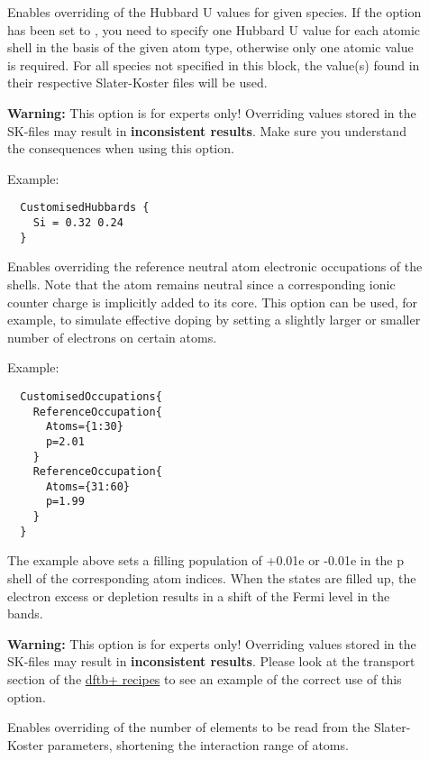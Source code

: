 \begin{description}
\item[] Enables overriding of the Hubbard U values for given species. If the
  option  has been set to , you need to specify one Hubbard U value
  for each atomic shell in the basis of the given atom type, otherwise only one atomic value is
  required. For all species not specified in this block, the value(s) found in their respective
  Slater-Koster files will be used.

  \textbf{Warning:} This option is for experts only! Overriding values stored in the SK-files may
  result in \textbf{inconsistent results}. Make sure you understand the consequences when using this
  option.

  Example:
  \begin{verbatim}
  CustomisedHubbards {
    Si = 0.32 0.24
  }
  \end{verbatim}

\item[] Enables overriding the reference neutral atom
  electronic occupations of the shells. Note that the atom remains neutral since
  a corresponding ionic counter charge is implicitly added to its core. This
  option can be used, for example, to simulate effective doping by setting a
  slightly larger or smaller number of electrons on certain atoms.

  Example:
  \begin{verbatim}
  CustomisedOccupations{
    ReferenceOccupation{
      Atoms={1:30}
      p=2.01
    }
    ReferenceOccupation{
      Atoms={31:60}
      p=1.99
    }
  }
  \end{verbatim}
  
  The example above sets a filling population of +0.01e or -0.01e in the p shell
  of the corresponding atom indices. When the states are filled up, the electron
  excess or depletion results in a shift of the Fermi level in the bands.

  \textbf{Warning:} This option is for experts only! Overriding values stored in
  the SK-files may result in \textbf{inconsistent results}. Please look at the
  transport section of the
  \href{https://dftbplus-recipes.readthedocs.io/en/latest/}{dftb+ recipes} to
  see an example of the correct use of this option.

\item[] Enables overriding of the number of elements to be
  read from the Slater-Koster parameters, shortening the interaction range of
  atoms. 


\end{description}
